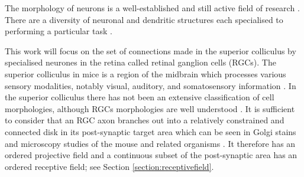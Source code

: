 The morphology of neurons is a well-established and still active field of research \cite{Chen2012-qw} . There are a diversity of neuronal and dendritic structures each specialised to performing a particular task \cite{Squire2012-ru}.

This work will focus on the set of connections made in the superior colliculus by specialised neurones in the retina called retinal ganglion cells (RGCs). The superior colliculus in mice is a region of the midbrain which processes various sensory modalities, notably visual, auditory, and somatosensory information \cite{Seabrook2017-fa}.  In the superior colliculus there has not been an extensive classification of cell morphologies, although RGCs morphologies are well understood \cite{Ito2018-ef, Baden2016-kx, Gale2014-ss}. It is sufficient to consider that an RGC axon branches out into a relatively constrained and connected disk in its post-synaptic target area which can be seen in Golgi stains and microscopy studies of the mouse and related organisms \cite{Valverde1973-ws, Paxinos2014-kq}. It therefore has an ordered projective field and a continuous subset of the post-synaptic area has an ordered receptive field; see Section \ref{section:receptivefield}.

